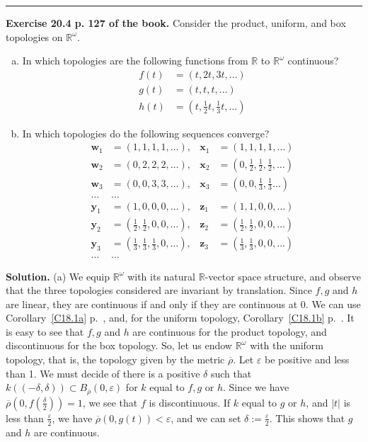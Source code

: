 \documentclass[12pt,letterpaper]{article}
\newcommand{\eps}{\varepsilon}
\newcommand{\noi}{\noindent}%
\newcommand{\R}{\mathbb R}
\begin{document}
\bigskip\hrule\bigskip

\noi\textbf{Exercise 20.4 p. 127 of the book.} Consider the product, uniform, and box topologies on $\mathbb{R}^{\omega}$. 

    \begin{enumerate}[(a)]
        \item In which topologies are the following functions from $\mathbb{R}$ to $\mathbb{R}^{\omega}$ continuous?
        \begin{align*}
            f(t) &= (t, 2t, 3t, \ldots) \\
            g(t) &= (t, t, t, \ldots) \\
            h(t) &= \left(t, \frac12t, \frac13t, \ldots\right)
        \end{align*}
        \item In which topologies do the following sequences converge?
        \begin{align*}
            \mathbf{w}_1 &= (1,1,1,1, \ldots), & \mathbf{x}_1 &= (1,1,1,1, \ldots) \\
            \mathbf{w}_2 &= (0,2,2,2, \ldots), & \mathbf{x}_2 &= \left(0, \frac12, \frac12, \frac12, \ldots\right) \\
            \mathbf{w}_3 &= (0,0,3,3, \ldots), & \mathbf{x}_3 &= \left(0,0, \frac13, \frac13 \ldots\right) \\
            \ldots & \ldots \\
            \mathbf{y}_1 &= (1,0,0,0, \ldots), & \mathbf{z}_1 &= (1,1,0,0, \ldots) \\
            \mathbf{y}_2 &= \left(\frac12, \frac12, 0,0, \ldots\right), & \mathbf{z}_2 &= \left(\frac12, \frac12, 0,0, \ldots\right) \\
            \mathbf{y}_3 &= \left(\frac13, \frac13, \frac13, 0, \ldots\right), & \mathbf{z}_3 &= \left(\frac13, \frac13, 0,0, \ldots\right) \\
            \ldots & \ldots
        \end{align*}
    \end{enumerate}

\noi\textbf{Solution.} (a) We equip $\R^\omega$ with its natural $\R$-vector space structure, and observe that the three topologies considered are invariant by translation. Since $f,g$ and $h$ are linear, they are continuous if and only if they are continuous at 0. We can use Corollary~\ref{C18.1a} p.~\pageref{C18.1a}, and, for the uniform topology, Corollary~\ref{C18.1b} p.~\pageref{C18.1b}. It is easy to see that $f,g$ and $h$ are continuous for the product topology, and discontinuous for the box topology. So, let us endow $\R^\omega$ with the uniform topology, that is, the topology given by the metric $\overline\rho$. Let $\eps$ be positive and less than 1. We must decide of there is a positive $\delta$ such that $k((-\delta,\delta))\subset B_{\overline\rho}(0,\eps)$ for $k$ equal to $f,g$ or $h$. Since we have $\overline\rho(0,f(\frac\delta2))=1$, we see that $f$ is discontinuous. If $k$ equal to $g$ or $h$, and $|t|$ is less than $\frac\eps2$, we have $\overline\rho(0,g(t))<\eps$, and we can set $\delta:=\frac\eps2$. This shows that $g$ and $h$ are continuous. 
\end{document}
